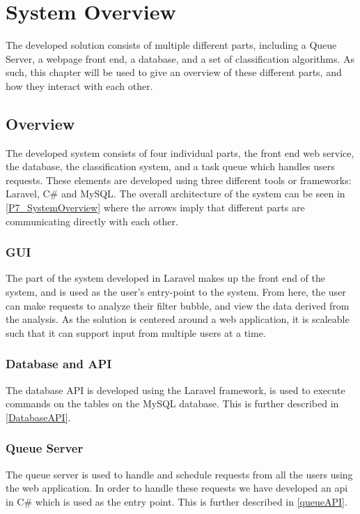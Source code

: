 \chapter{System Overview}\label{ch:sysview}  The developed solution consists of multiple different parts, including a Queue
Server, a webpage front end, a database, and a set of classification algorithms.
As such, this chapter will be used to give an overview of these different parts,
and how they interact with each other.

\section{Overview}
The developed system consists of four individual parts, the front end web
service, the database, the classification system, and a task queue which handles
users requests. These elements are developed using three different tools or
frameworks: Laravel, C\# and MySQL. The overall architecture of the system can
be seen in \autoref{P7_SystemOverview} where the arrows imply that different parts
are communicating directly with each other.
 

\subsection{GUI} %
The part of the system developed in Laravel makes up the front end of the
system, and is used as the user's entry-point to the system. From here, the user can
make requests to analyze their filter bubble, and view the data derived from
the analysis. As the solution is centered around a web application, it is
scaleable such that it can support input from multiple users at a time.\nl

\subsection{Database and API}
The database API is developed using the Laravel framework, is used to execute
commands on the tables on the MySQL database. This is further described in
\autoref{DatabaseAPI}.

\subsection{Queue Server}
The queue server is used to handle and schedule requests from all the users
using the web application. In order to handle these requests we have developed
an api in C\# which is used as the entry point. This is further described in
\autoref{queueAPI}. 

